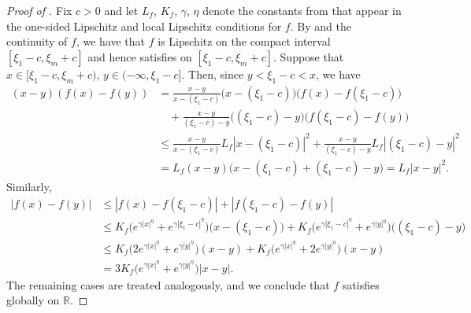 \documentclass[onseside, final]{amsart}
\theoremstyle{definition}
\newcommand{\R}{\mathbb R}
\numberwithin{equation}{section}
\begin{document}
	\begin{proof}[Proof of ]
		Fix $c > 0$ and let $L_f$, $K_f$, $\gamma$, $\eta$ denote the constants from  that appear in the one-sided Lipschitz and local Lipschitz conditions for $f$. By  and the continuity of $f$, we have that $f$ is Lipschitz on the compact interval $[\xi_1 - c, \xi_m + c]$ and hence satisfies  on $[\xi_1 - c, \xi_m + c]$. Suppose that  $x \in [\xi_1 - c, \xi_m + c)$, $y \in (-\infty, \xi_1 - c]$. Then, since $y < \xi_1 - c < x$, we have
		\begin{align}
			(x - y)(f(x) - f(y)) & = \frac{x - y}{x - (\xi_1 - c)}\bigl(x - (\xi_1 - c)\bigr)\bigl(f(x) - f(\xi_1 - c)\bigr)\\
			& \quad + \frac{x - y}{(\xi_1 - c) - y}\bigl((\xi_1 - c) - y\bigr)\bigl(f(\xi_1 - c) - f(y)\bigr)\\
			& \leq \frac{x - y}{x - (\xi_1 - c)}L_f|x - (\xi_1 - c)|^2 + \frac{x - y}{(\xi_1 - c) - y}L_f|(\xi_1 - c) - y|^2\\
			& = L_f (x - y)\bigl(x - (\xi_1 - c) + (\xi_1 - c) - y\bigr) = L_f |x - y|^2.
		\end{align}
		Similarly,
		\begin{align}
			|f(x) - f(y)| & \leq |f(x) - f(\xi_1 - c)| + |f(\xi_1 - c) - f(y)|\\
			& \leq K_f \bigl(e^{\gamma |x|^\eta} + e^{\gamma |\xi_1 - c|^\eta}\bigr)\bigl(x - (\xi_1 - c)\bigr) + K_f \bigl(e^{\gamma |\xi_1 - c|^\eta} + e^{\gamma |y|^\eta}\bigr)\bigl((\xi_1 - c) - y\bigr)\\
			& \leq K_f \bigl(2e^{\gamma |x|^\eta} + e^{\gamma |y|^\eta}\bigr)(x - y) + K_f \bigl(e^{\gamma |x|^\eta} + 2e^{\gamma |y|^\eta}\bigr)(x - y)\\
			& = 3 K_f \bigl(e^{\gamma |x|^\eta} + e^{\gamma |y|^\eta}\bigr)|x - y|.
		\end{align}
		The remaining cases are treated analogously, and we conclude that $f$ satisfies  globally on $\R$.
	\end{proof}
\end{document}
